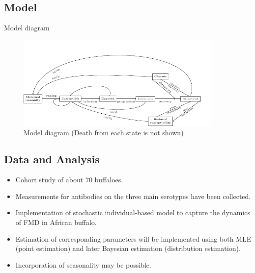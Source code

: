 \documentclass[10pt]{beamer}
\theoremstyle{plain}
\theoremstyle{definition}
\theoremstyle{remark}
\begin{document}
\subsection{Model}

\begin{frame}{Model diagram}
\begin{figure}
  \centering
  \includegraphics[width=0.9\textwidth]{figure1.pdf}
  \caption{Model diagram (Death from each state is not shown)}
  \label{fig:diagram}
\end{figure}
\end{frame}


\subsection{Data and Analysis}
\begin{frame}
\begin{itemize}
\item Cohort study of about 70 buffaloes.
\item Measurements for antibodies on the three main serotypes have been collected.
\item Implementation of stochastic individual-based model to capture the dynamics of FMD in 
African buffalo.
\item Estimation of corresponding parameters will be implemented using both MLE (point 
estimation) and later Bayesian estimation (distribution estimation).
\item Incorporation of seasonality may be possible.
\end{itemize}
\end{frame}
\end{document}
